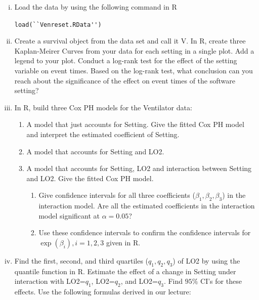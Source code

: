 \documentclass[12pt]{article}
\begin{document}
\begin{enumerate}[i.]
\item Load the data by using the following command in R

 \lstinline{load(``Venreset.RData'')}

\item Create a survival object from the data set and call it V. In R, create three Kaplan-Meirer Curves from your data for each setting in a single plot. Add a legend to your plot. Conduct a log-rank test for the effect of the setting variable on event times. Based on the log-rank test, what conclusion can you reach about the significance of the effect on event times of the software setting?
\item In R, build three Cox PH models for the Ventilator data: 
\begin{enumerate}
\item A model that just accounts for Setting. Give the fitted Cox PH model and interpret the estimated coefficient of Setting.
\item A model that accounts for Setting and LO2.
\item A model that accounts for Setting, LO2 and interaction between Setting and LO2. Give the fitted Cox PH model.
\begin{enumerate}[1.]  
\item Give confidence intervals for all three coefficients ($\beta_1, \beta_2, \beta_3$) in the interaction model. Are all the estimated coefficients in the interaction model significant at $\alpha=0.05$?
\item  Use these confidence intervals to confirm the confidence intervals for $\exp(\beta_i), i=1,2,3$ given in R.
\end{enumerate} 
\end{enumerate}
\item Find the first, second, and third quartiles ($q_1, q_2, q_3$) of LO2 by using the quantile function in R. Estimate the effect of a change in Setting under interaction with  LO2=$q_1$, LO2=$q_2$, and LO2=$q_3$. Find $95\%$ CI's for these effects. Use the following formulas derived in our lecture:


\end{enumerate}
\end{document}
